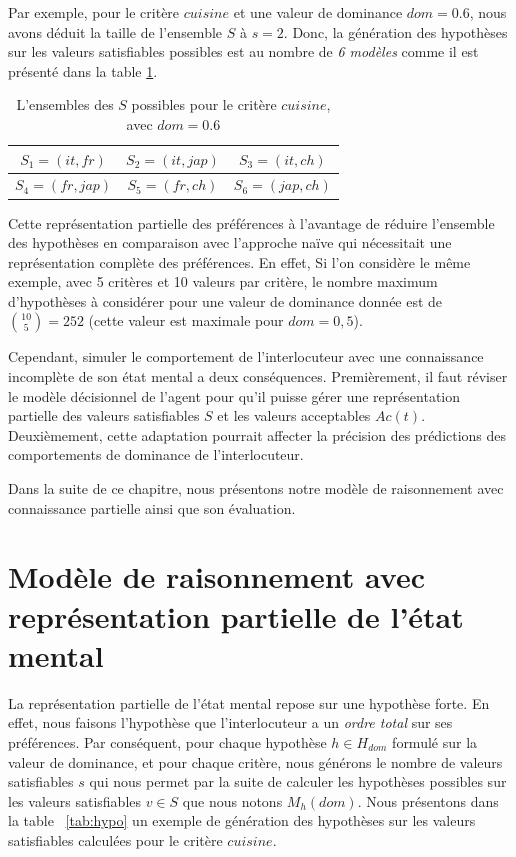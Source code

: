 Par exemple, pour le critère $cuisine$ et une valeur de dominance $dom =0.6$, nous avons déduit la taille de l'ensemble $S$ à $s=2$. Donc, la génération des hypothèses sur les valeurs satisfiables possibles est au nombre de \textit{6 modèles} comme il est présenté dans la table \ref{tab:sat_poss}.

	\begin{table}[h]
		\centering
		\caption{L'ensembles des $S$ possibles pour le critère $cuisine$, avec $dom=0.6$}
		\label{tab:sat_poss}
	
		\begin{tabular}{|c|c|c|}%
			\hline
			$S_1=(it,fr)$& $S_2=(it,jap)$ & $S_3=(it,ch)$\\
			\hline
			$S_4=(fr,jap)$ & $S_5=(fr,ch)$ & $S_6=(jap,ch)$ \\
			\hline
		\end{tabular}
	\end{table}
	
	Cette représentation partielle des préférences à l'avantage de réduire l'ensemble des hypothèses en comparaison avec l'approche naïve qui nécessitait une représentation complète des préférences. En effet, Si l'on considère le même exemple, avec 5 critères et 10 valeurs par critère, le nombre maximum d'hypothèses à considérer pour une valeur de dominance donnée est de $ \binom {10} {5} = 252 $ (cette valeur est maximale pour $ dom = 0,5 $).
	
	Cependant, simuler le comportement de l'interlocuteur avec une connaissance incomplète de son état mental a deux conséquences.
	Premièrement, il faut réviser  le modèle décisionnel de l'agent pour qu'il puisse gérer une représentation partielle des valeurs satisfiables $S$ et les valeurs acceptables $Ac(t)$. Deuxièmement, cette adaptation pourrait affecter la précision des prédictions des comportements de dominance de l'interlocuteur.
	
	Dans la suite de ce chapitre, nous présentons notre modèle de raisonnement avec connaissance partielle ainsi que son évaluation. 
	
	

\section{Modèle de raisonnement avec représentation partielle de l'état mental}
La représentation partielle de l'état mental repose sur une hypothèse forte. En effet, nous faisons l'hypothèse que l'interlocuteur a un \textit{ordre total} sur ses préférences. Par conséquent, pour chaque hypothèse $h\in H_{dom} $ formulé sur la valeur de dominance, et pour chaque critère, nous générons le nombre de valeurs satisfiables $s$ qui nous permet par la suite de calculer les hypothèses possibles sur les valeurs satisfiables $v\in S$ que nous notons $M_h(dom)$. Nous présentons dans la table ~\ref{tab:hypo} un exemple de génération des hypothèses sur les valeurs satisfiables calculées pour le critère $cuisine$. 

